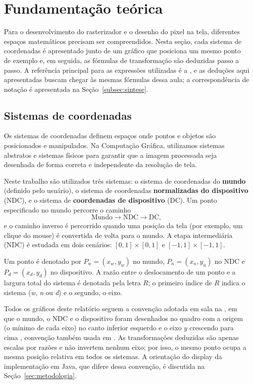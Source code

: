\section{Fundamentação teórica}
\label{sec:fundamentacao-teorica}
Para o desenvolvimento do rasterizador e o desenho do pixel na tela, diferentes espaços matemáticos precisam ser compreendidos. Nesta seção, cada sistema de coordenadas é apresentado junto de um gráfico que posiciona um mesmo ponto de exemplo e, em seguida, as fórmulas de transformação são deduzidas passo a passo. A referência principal para as expressões utilizadas é a \aula, e as deduções aqui apresentadas buscam chegar às mesmas fórmulas dessa aula; a correspondência de notação é apresentada na Seção~\ref{subsec:sintese}.

\subsection{Sistemas de coordenadas}
Os sistemas de coordenadas definem espaços onde pontos e objetos são posicionados e manipulados. Na Computação Gráfica, utilizamos sistemas abstratos e sistemas físicos para garantir que a imagem processada seja desenhada de forma correta e independente da resolução de tela.

Neste trabalho são utilizados três sistemas: o sistema de coordenadas do \textbf{mundo} (definido pelo usuário), o sistema de coordenadas \textbf{normalizadas do dispositivo} (NDC), e o sistema de \textbf{coordenadas de dispositivo} (DC). Um ponto especificado no mundo percorre o caminho
\[
    \text{Mundo} \longrightarrow \text{NDC} \longrightarrow \text{DC},
\]
e o caminho inverso é percorrido quando uma posição da tela (por exemplo, um clique do mouse) é convertida de volta para o mundo. A etapa intermediária (NDC) é estudada em dois cenários: $[0,1] \times [0,1]$ e $[-1,1] \times [-1,1]$.

Um ponto é denotado por $P_w = (x_w, y_w)$ no mundo, $P_n = (x_n, y_n)$ no NDC e $P_d = (x_d, y_d)$ no dispositivo. A razão entre o deslocamento de um ponto e a largura total do sistema é denotada pela letra $R$; o primeiro índice de $R$ indica o sistema (\emph{w}, \emph{n} ou \emph{d}) e o segundo, o eixo.

Todos os gráficos deste relatório seguem a convenção adotada em sala na \aularef, em que o mundo, o NDC e o dispositivo foram desenhados no quadro com a origem (o mínimo de cada eixo) no canto inferior esquerdo e o eixo $y$ crescendo para cima \cite{quadro2}, convenção também usada em \cite{foley}. As transformações deduzidas são apenas escalas por razões e não invertem nenhum eixo; por isso, o mesmo ponto ocupa a mesma posição relativa em todos os sistemas. A orientação do display da implementação em Java, que difere dessa convenção, é discutida na Seção~\ref{sec:metodologia}.

